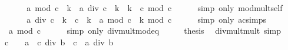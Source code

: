 \begin{isabellebody}
\ \ \isamarkupfalse%
\ \isamarkupfalse%
\ {\isachardoublequoteopen}{\isasymdots}\ {\isacharequal}{\kern0pt}\ {\isacharparenleft}{\kern0pt}a\ mod\ {\isacharparenleft}{\kern0pt}c\ {\isacharasterisk}{\kern0pt}\ k{\isacharparenright}{\kern0pt}\ {\isacharplus}{\kern0pt}\ a\ div\ {\isacharparenleft}{\kern0pt}c\ {\isacharasterisk}{\kern0pt}\ k{\isacharparenright}{\kern0pt}\ {\isacharasterisk}{\kern0pt}\ k\ {\isacharasterisk}{\kern0pt}\ c{\isacharparenright}{\kern0pt}\ mod\ c{\isachardoublequoteclose}\isanewline
\ \ \ \ \isamarkupfalse%
\ {\isacharparenleft}{\kern0pt}simp\ only{\isacharcolon}{\kern0pt}\ mod{\isacharunderscore}{\kern0pt}mult{\isacharunderscore}{\kern0pt}self{}{\isacharparenright}{\kern0pt}\isanewline
\ \ \isamarkupfalse%
\ \isamarkupfalse%
\ {\isachardoublequoteopen}{\isasymdots}\ {\isacharequal}{\kern0pt}\ {\isacharparenleft}{\kern0pt}a\ div\ {\isacharparenleft}{\kern0pt}c\ {\isacharasterisk}{\kern0pt}\ k{\isacharparenright}{\kern0pt}\ {\isacharasterisk}{\kern0pt}\ {\isacharparenleft}{\kern0pt}c\ {\isacharasterisk}{\kern0pt}\ k{\isacharparenright}{\kern0pt}\ {\isacharplus}{\kern0pt}\ a\ mod\ {\isacharparenleft}{\kern0pt}c\ {\isacharasterisk}{\kern0pt}\ k{\isacharparenright}{\kern0pt}{\isacharparenright}{\kern0pt}\ mod\ c{\isachardoublequoteclose}\isanewline
\ \ \ \ \isamarkupfalse%
\ {\isacharparenleft}{\kern0pt}simp\ only{\isacharcolon}{\kern0pt}\ ac{\isacharunderscore}{\kern0pt}simps{\isacharparenright}{\kern0pt}\isanewline
\ \ \isamarkupfalse%
\ \isamarkupfalse%
\ {\isachardoublequoteopen}{\isasymdots}\ {\isacharequal}{\kern0pt}\ a\ mod\ c{\isachardoublequoteclose}\isanewline
\ \ \ \ \isamarkupfalse%
\ {\isacharparenleft}{\kern0pt}simp\ only{\isacharcolon}{\kern0pt}\ div{\isacharunderscore}{\kern0pt}mult{\isacharunderscore}{\kern0pt}mod{\isacharunderscore}{\kern0pt}eq{\isacharparenright}{\kern0pt}\isanewline
\ \ \isamarkupfalse%
\ \isamarkupfalse%
\ {\isacharquery}{\kern0pt}thesis\ \isacommand{{\isachardot}{\kern0pt}}\isamarkupfalse%
\isanewline
{}\isamarkupfalse%
%
\endisatagproof
{\isafoldproof}%
%
\isadelimproof
\isanewline
%
\endisadelimproof
\isanewline
{}\isamarkupfalse%
\ div{\isacharunderscore}{\kern0pt}mult{\isacharunderscore}{\kern0pt}mult{}\ {\isacharbrackleft}{\kern0pt}simp{\isacharbrackright}{\kern0pt}{\isacharcolon}{\kern0pt}\isanewline
\ \ {\isachardoublequoteopen}c\ {\isasymnoteq}\ {}\ {\isasymLongrightarrow}\ {\isacharparenleft}{\kern0pt}a\ {\isacharasterisk}{\kern0pt}\ c{\isacharparenright}{\kern0pt}\ div\ {\isacharparenleft}{\kern0pt}b\ {\isacharasterisk}{\kern0pt}\ c{\isacharparenright}{\kern0pt}\ {\isacharequal}{\kern0pt}\ a\ div\ b{\isachardoublequoteclose}\isanewline

\end{isabellebody}
